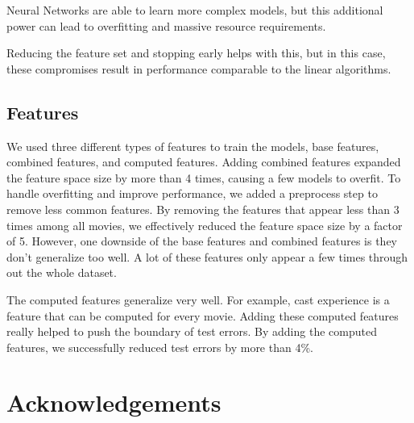 \documentclass[journal]{IEEEtran}
\begin{document}
\par Neural Networks are able to learn more complex models, but this additional
power can lead to overfitting and massive resource requirements.

\par Reducing the feature set and stopping early helps with this, but in this
case, these compromises result in performance comparable to the linear
algorithms.

\subsection{Features}

We used three different types of features to train the models, base features, combined features, and computed features. Adding combined features expanded the feature space size by more than 4 times, causing a few models to overfit. To handle overfitting and improve performance, we added a preprocess step to remove less common features. By removing the features that appear less than 3 times among all movies, we effectively reduced the feature space size by a factor of 5. However, one downside of the base features and combined features is they don't generalize too well. A lot of these features only appear a few times through out the whole dataset.

\par The computed features generalize very well. For example, cast experience is a feature that can be computed for every movie. Adding these computed features really helped to push the boundary of test errors. By adding the computed features, we successfully reduced test errors by more than 4\%.


\section{Acknowledgements}

\end{document}
